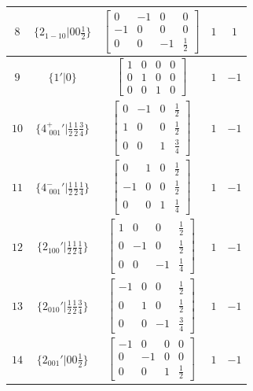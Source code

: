 \documentclass[fleqn,8pt]{jsarticle}
\begin{document}
\begin{longtable}{ccccc}
$ 8 $ & $ \{2{}_{1-10}|0 0 \frac{1}{2}\} $ & $ \begin{bmatrix} 0 & -1 & 0 & 0 \\ -1 & 0 & 0 & 0 \\ 0 & 0 & -1 & \frac{1}{2} \end{bmatrix} $ & $ 1 $ & $ 1 $ \\ \hline
$ 9 $ & $ \{1{}'|0\} $ & $ \begin{bmatrix} 1 & 0 & 0 & 0 \\ 0 & 1 & 0 & 0 \\ 0 & 0 & 1 & 0 \end{bmatrix} $ & $ 1 $ & $ -1 $ \\ \hline
$ 10 $ & $ \{4^{+}_{\,\,001}{}'|\frac{1}{2} \frac{1}{2} \frac{3}{4}\} $ & $ \begin{bmatrix} 0 & -1 & 0 & \frac{1}{2} \\ 1 & 0 & 0 & \frac{1}{2} \\ 0 & 0 & 1 & \frac{3}{4} \end{bmatrix} $ & $ 1 $ & $ -1 $ \\ \hline
$ 11 $ & $ \{4^{-}_{\,\,001}{}'|\frac{1}{2} \frac{1}{2} \frac{1}{4}\} $ & $ \begin{bmatrix} 0 & 1 & 0 & \frac{1}{2} \\ -1 & 0 & 0 & \frac{1}{2} \\ 0 & 0 & 1 & \frac{1}{4} \end{bmatrix} $ & $ 1 $ & $ -1 $ \\ \hline
$ 12 $ & $ \{2{}_{100}{}'|\frac{1}{2} \frac{1}{2} \frac{1}{4}\} $ & $ \begin{bmatrix} 1 & 0 & 0 & \frac{1}{2} \\ 0 & -1 & 0 & \frac{1}{2} \\ 0 & 0 & -1 & \frac{1}{4} \end{bmatrix} $ & $ 1 $ & $ -1 $ \\ \hline
$ 13 $ & $ \{2{}_{010}{}'|\frac{1}{2} \frac{1}{2} \frac{3}{4}\} $ & $ \begin{bmatrix} -1 & 0 & 0 & \frac{1}{2} \\ 0 & 1 & 0 & \frac{1}{2} \\ 0 & 0 & -1 & \frac{3}{4} \end{bmatrix} $ & $ 1 $ & $ -1 $ \\ \hline
$ 14 $ & $ \{2{}_{001}{}'|0 0 \frac{1}{2}\} $ & $ \begin{bmatrix} -1 & 0 & 0 & 0 \\ 0 & -1 & 0 & 0 \\ 0 & 0 & 1 & \frac{1}{2} \end{bmatrix} $ & $ 1 $ & $ -1 $ \\ \hline

\end{longtable}
\end{document}
